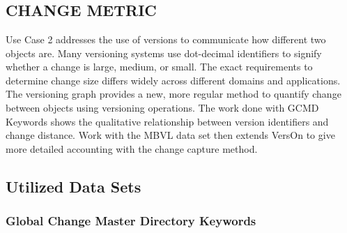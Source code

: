 
\chapter{}

\section{CHANGE METRIC} \label{ch:distance}

Use Case 2 addresses the use of versions to communicate how different two objects are.
Many versioning systems use dot-decimal identifiers to signify whether a change is large, medium, or small.
The exact requirements to determine change size differs widely across different domains and applications.
The versioning graph provides a new, more regular method to quantify change between objects using versioning operations.
The work done with GCMD Keywords shows the qualitative relationship between version identifiers and change distance.
Work with the MBVL data set then extends VersOn to give more detailed accounting with the change capture method.

\section{Utilized Data Sets}

\subsection{Global Change Master Directory Keywords}

